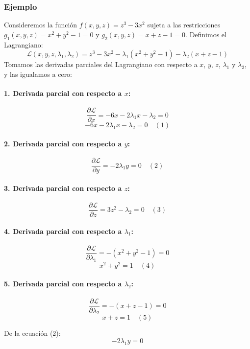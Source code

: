 \documentclass[11pt]{book}
\theoremstyle{definicion}
\theoremstyle{teorema}
\theoremstyle{ejemplo}
\begin{document}
\subsubsection{Ejemplo}

Consideremos la función \( f(x, y, z) = z^3 - 3x^2 \) sujeta a las restricciones \( g_1(x, y, z) = x^2 + y^2 - 1 = 0 \) y \( g_2(x, y, z) = x + z - 1 = 0 \).
%
%
Definimos el Lagrangiano:
\[ \mathcal{L}(x, y, z, \lambda_1, \lambda_2) = z^3 - 3x^2 - \lambda_1 (x^2 + y^2 - 1) - \lambda_2 (x + z - 1) \]
%
Tomamos las derivadas parciales del Lagrangiano con respecto a \(x\), \(y\), \(z\), \(\lambda_1\) y \(\lambda_2\), y las igualamos a cero:

\paragraph{1. Derivada parcial con respecto a \(x\):}
\[ \frac{\partial \mathcal{L}}{\partial x} = -6x - 2\lambda_1 x - \lambda_2 = 0 \]
\[ -6x - 2\lambda_1 x - \lambda_2 = 0 \quad (1) \]

\paragraph{2. Derivada parcial con respecto a \(y\):}
\[ \frac{\partial \mathcal{L}}{\partial y} = -2\lambda_1 y = 0 \quad (2) \]

\paragraph{3. Derivada parcial con respecto a \(z\):}
\[ \frac{\partial \mathcal{L}}{\partial z} = 3z^2 - \lambda_2 = 0 \quad (3) \]

\paragraph{4. Derivada parcial con respecto a \(\lambda_1\):}
\[ \frac{\partial \mathcal{L}}{\partial \lambda_1} = -(x^2 + y^2 - 1) = 0 \]
\[ x^2 + y^2 = 1 \quad (4) \]

\paragraph{5. Derivada parcial con respecto a \(\lambda_2\):}
\[ \frac{\partial \mathcal{L}}{\partial \lambda_2} = -(x + z - 1) = 0 \]
\[ x + z = 1 \quad (5) \]

De la ecuación (2):
\[ -2\lambda_1 y = 0 \]
\end{document}
